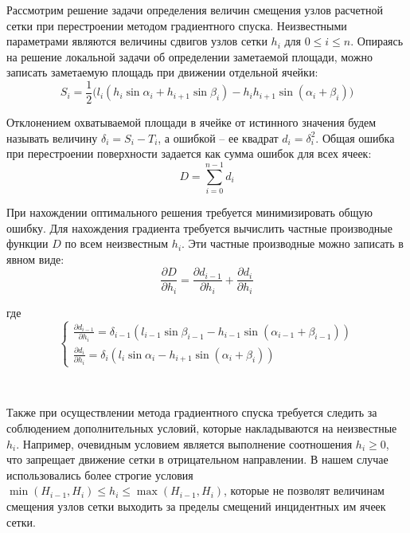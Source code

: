 Рассмотрим решение задачи определения величин смещения узлов расчетной сетки при перестроении методом градиентного спуска.
Неизвестными параметрами являются величины сдвигов узлов сетки $h_i$ для $0 \le i \le n$.
Опираясь на решение локальной задачи об определении заметаемой площади, можно записать заметаемую площадь при движении отдельной ячейки:
\begin{equation}
S_i = \frac{1}{2}\big(l_i(h_i \sin \alpha_i + h_{i + 1} \sin \beta_i) - h_ih_{i + 1} \sin(\alpha_i + \beta_i)\big) 
\end{equation}

Отклонением охватываемой площади в ячейке от истинного значения будем называть величину $\delta_i = S_i - T_i$, а ошибкой -- ее квадрат $d_i = \delta_i^2$.
Общая ошибка при перестроении поверхности задается как сумма ошибок для всех ячеек:
\begin{equation}
D = \sum_{i = 0}^{n - 1}{d_i}
\end{equation}

При нахождении оптимального решения требуется минимизировать общую ошибку.
Для нахождения градиента требуется вычислить частные производные функции $D$ по всем неизвестным $h_i$.
Эти частные производные можно записать в явном виде:
\begin{equation}
\frac{\partial D}{\partial h_i} = \frac{\partial d_{i - 1}}{\partial h_i} + \frac{\partial d_i}{\partial h_i}
\end{equation}

где
\begin{equation}
\begin{cases}
\frac{\partial d_{i - 1}}{\partial h_i} = \delta_{i - 1}(l_{i - 1} \sin \beta_{i - 1} - h_{i - 1} \sin(\alpha_{i - 1} + \beta_{i - 1})) \\
\frac{\partial d_i}{\partial h_i} = \delta_i(l_i \sin \alpha_i - h_{i + 1} \sin(\alpha_i + \beta_i))
\end{cases}
\end{equation}

\

Также при осуществлении метода градиентного спуска требуется следить за соблюдением дополнительных условий, которые накладываются на неизвестные $h_i$.
Например, очевидным условием является выполнение соотношения $h_i \ge 0$, что запрещает движение сетки в отрицательном направлении.
В нашем случае использовались более строгие условия $\min(H_{i - 1}, H_i) \le h_i \le \max(H_{i - 1}, H_i)$, которые не позволят величинам смещения узлов сетки выходить за пределы смещений инцидентных им ячеек сетки.

